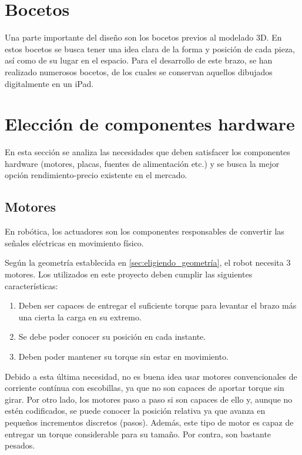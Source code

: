 \section{Bocetos}
Una parte importante del diseño son los bocetos previos al modelado 3D. En estos bocetos se busca tener una idea clara de la forma 
y posición de cada pieza, así como de su lugar en el espacio.  
Para el desarrollo de este brazo, se han realizado numerosos bocetos, de los cuales se conservan aquellos dibujados digitalmente en 
un iPad.
\section{Elección de componentes hardware}
En esta sección se analiza las necesidades que deben satisfacer los componentes hardware (motores, placas, fuentes de alimentación etc.)
y se busca la mejor opción rendimiento-precio existente en el mercado. 

\subsection{Motores}
En robótica, los actuadores son los componentes responsables de convertir las señales eléctricas 
en movimiento físico.

Según la geometría establecida en \ref{sec:eligiendo_geometría}, el robot necesita 3 motores. Los utilizados en este proyecto deben
cumplir las siguientes características:
\begin{enumerate}
  \item Deben ser capaces de entregar el suficiente torque para levantar el brazo más una cierta la carga en su extremo.
  \item Se debe poder conocer su posición en cada instante.
  \item Deben poder mantener su torque sin estar en movimiento.
\end{enumerate}

Debido a esta última necesidad, no es buena idea usar motores convencionales de corriente contínua con escobillas, ya que no son 
capaces de aportar torque sin girar. Por otro lado, los motores paso a paso si son capaces de ello y, aunque no estén codificados,
se puede conocer la posición relativa ya que avanza en pequeños incrementos discretos (pasos). Además, este tipo de motor es capaz de 
entregar un torque considerable para su tamaño. Por contra, son bastante pesados. 

